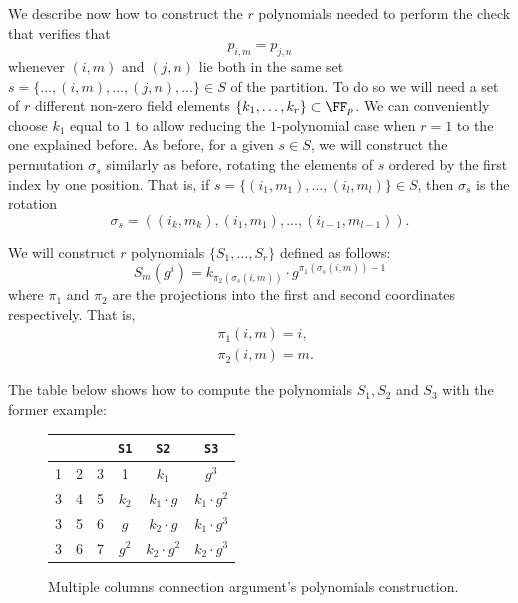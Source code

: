 We describe now how to construct the $r$ polynomials needed to perform the check that verifies that
\[
p_{i, m} = p_{j, n}
\]
whenever $(i, m)$ and $(j, n)$ lie both in the same set $s = \{\dots, (i, m), \dots, (j, n), \dots\} \in S$ of the partition. To do so we will need a set of $r$ different non-zero field elements $\{k_1, \dots, k_r\} \subset \FF_p$. We can conveniently choose $k_1$ equal to $1$ to allow reducing the $1$-polynomial case when $r=1$ to the one explained before. As before, for a given $s \in S$, we will construct the permutation $\sigma_s$ similarly as before, rotating the elements of $s$ ordered by the first index by one position. That is, if $s = \{(i_1, m_1), \dots, (i_l, m_l)\} \in S$, then $\sigma_s$ is the rotation
\[
\sigma_s = ((i_k, m_k), (i_1, m_1), \dots, (i_{l-1}, m_{l-1})).
\]

We will construct $r$ polynomials $\{S_1, \dots, S_r\}$ defined as follows:
\[
S_m(g^i) = k_{\pi_2(\sigma_s(i, m))} \cdot g^{\pi_1(\sigma_s(i, m)) - 1}
\]
where $\pi_1$ and $\pi_2$ are the projections into the first and second coordinates respectively. That is,
\begin{align*}
&\pi_1(i, m) = i, \\
&\pi_2(i, m) = m. 
\end{align*}


The table below shows how to compute the polynomials $S_1, S_2$ and $S_3$ with the former example:
\begin{figure}[H]
\centering
\begin{tabular}{|c|c|c|c|c|c|}
\hline
\att	&\btt	&\ctt	     				        &\texttt{S1}	&\texttt{S2}			&\texttt{S3}			\\ \hline
1					&2					&\cellcolor{cyan}3						&1				&$k_1$					&\cellcolor{cyan}$g^3$				\\
\cellcolor{cyan} 3	&4					&\cellcolor{pink} 5 	&\cellcolor{cyan}$k_2$			&$k_1 \cdot g$		&\cellcolor{pink} $k_1 \cdot g^2$	\\
\cellcolor{cyan} 3	&\cellcolor{pink} 5	&\cellcolor{brown} 6 	&\cellcolor{cyan}$g$		&\cellcolor{pink}$k_2 \cdot g$		&\cellcolor{brown} $k_1 \cdot g^3$	\\
\cellcolor{cyan} 3	&\cellcolor{brown}6	&7 						&\cellcolor{cyan}$g^2$		&\cellcolor{brown}$k_2 \cdot g^2$	&$k_2 \cdot g^3$	\\
\hline
\end{tabular}
\caption{Multiple columns connection argument's polynomials construction. }
\label{table:connection-arg-complex-example-permutation-poly}
\end{figure}

